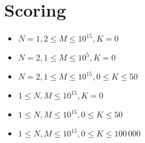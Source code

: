 \section*{Scoring}
\begin{itemize}
  \item $N = 1, 2 \le M \le 10^{15}, K = 0$
  \item $N = 2, 1 \le M \le 10^5, K = 0$
  \item $N = 2, 1 \le M \le 10^{15}, 0 \le K \le 50$
  \item $1 \le N, M \le 10^{15}, K = 0$
  \item $1 \le N, M \le 10^{15}, 0 \le K \le 50$
  \item $1 \le N, M \le 10^{15}, 0 \le K \le 100\,000$
\end{itemize}
